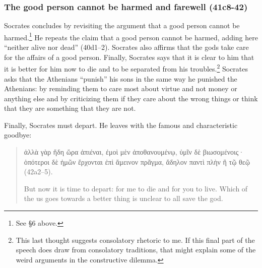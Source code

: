 \documentclass[11pt]{article}
\begin{document}
\begin{enumerate}
\end{enumerate}


\subsubsection{The good person cannot be harmed and farewell (41c8-42)}

Socrates concludes by revisiting the argument that a good person cannot be harmed.\footnote{See \S6 above.}  He repeats the claim that a good person cannot be harmed, adding here ``neither alive nor dead'' (40d1--2).  Socrates also affirms that the gods take care for the affairs of a good person.  Finally, Socrates says that it is clear to him that it is better for him now to die and to be separated from his troubles.\footnote{This last thought suggests consolatory rhetoric to me.  If this final part of the speech does draw from consolatory traditions, that might explain some of the weird arguments in the constructive dilemma.}  Socrates asks that the Athenians ``punish'' his sons in the same way he punished the Athenians: by reminding them to care most about virtue and not money or anything else and by criticizing them if they care about the wrong things or think that they are something that they are not.

Finally, Socrates must depart.  He leaves with the famous and characteristic goodbye:

\begin{quote}

    {\g
    ἀλλὰ γὰρ ἤδη ὥρα ἀπιέναι, ἐμοὶ μὲν ἀποθανουμένῳ, ὑμῖν δὲ βιωσομένοις· ὁπότεροι δὲ ἡμῶν ἔρχονται ἐπὶ ἄμεινον πρᾶγμα, ἄδηλον παντὶ πλὴν ἢ τῷ θεῷ
    }(42a2--5).

    But now it is time to depart: for me to die and for you to live. Which of the us goes towards a better thing is unclear to all save the god.

\end{quote}




\newpage


\end{document}
